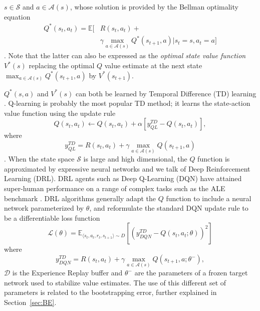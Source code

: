 $s\in\mathcal{S}$ and $a\in\mathcal{A}\left(s\right)$, whose solution
is provided by the Bellman optimality equation
\begin{equation}
\begin{aligned}
Q^*\left(s_t,a_t\right)=\mathbb{E}\bigg[&R\left(s_t,a_t\right)+\\ &\gamma
  \max_{a\in\mathcal{A}\left(s\right)}Q^*\left(s_{t+1},a\right)\bigg\vert
  s_t=s,a_t=a \bigg]
\end{aligned}
\end{equation}
\citep{bellman1957dynamic}. Note that the latter can
also be expressed as the \textit{optimal state value function}
$V^*\left(s\right)$ replacing the optimal $Q$ value estimate at
the next state
$\max_{a\in\mathcal{A}\left(s\right)}Q^*\left(s_{t+1},a\right)$ by
$V^*\left(s_{t+1}\right)$.

$Q^*\left(s,a\right)$ and $V^*\left(s\right)$ can both be learned by
Temporal Difference (TD) learning
\citep{sutton1988learning}. Q-learning is probably the most popular TD
method; it learns the state-action value function using the update
rule
\begin{equation}
Q\left(s_t,a_t\right)\leftarrow
Q\left(s_t,a_t\right)+\alpha\left[y^{\scriptscriptstyle
TD}_{\scriptscriptstyle QL}-Q\left(s_t,a_t\right)\right],
\end{equation}
where
\begin{equation}\label{eq:ql_td}
y^{\scriptscriptstyle TD}_{\scriptscriptstyle
QL}=R\left(s_t,a_t\right)+\gamma\max_{a\in\mathcal{A}\left(s\right)}Q\left(s_{t+1},a\right)
\end{equation}
\citep{watkins1992q}. When the state space $\mathcal{S}$ is large and
high dimensional, the $Q$ function is approximated by expressive
neural networks and we talk of Deep Reinforcement Learning
(DRL). DRL agents such as Deep Q-Learning (DQN)
\citep{mnih2013playing} have attained super-human performance on a
range of complex tasks such as the ALE benchmark
\citep{bellemare2013arcade}. DRL algorithms generally adapt the $Q$
function to include a neural network parameterized by $\theta$, and
reformulate the standard DQN update rule to be a differentiable loss
function
\begin{equation}
\mathcal{L}(\theta)=\mathbb{E}_{\langle s_t,a_t,r_t,s_{t+1}\rangle\sim
D}\left[{\left(y^{\scriptscriptstyle TD}_{\scriptscriptstyle
DQN}-Q\left(s_t, a_t;\theta\right)\right)}^2\right]
\end{equation}
where
\begin{equation}\label{eq:dqn_td}
y^{\scriptscriptstyle TD}_{\scriptscriptstyle
DQN}=R\left(s_t,a_t\right)+\gamma\max_{a\in\mathcal{A}(s)}Q\left(s_{t+1},a;\theta^{-}\right),
\end{equation}
$\mathcal{D}$ is the Experience Replay buffer
\citep{lin1992self} and $\theta^-$ are the parameters of a frozen
target network used to stabilize value estimates. The use of this
different set of parameters is related to the bootstrapping error,
further explained in Section~\ref{sec:BE}.

